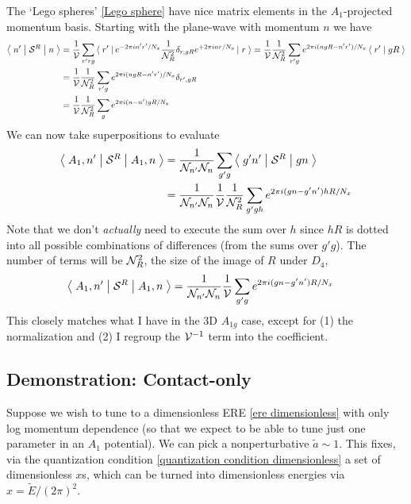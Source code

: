 The `Lego spheres' \eqref{Lego sphere} have nice matrix elements in the $A_1$-projected momentum basis.
Starting with the plane-wave with momentum $n$ we have
\begin{align}
    \left\langle\;n'\;\middle|\;\mathcal{S}^{R}\;\middle|\;n\;\right\rangle
    &=
    \frac{1}{\mathcal{V}} \sum_{r'rg} \left\langle\;r'\;\right| e^{-2\pi i n'r' / N_x} \frac{1}{\mathcal{N}_{R}^2} \delta_{r,gR} e^{+2\pi i nr / N_x} \left|\;r\;\right\rangle
    =
    \frac{1}{\mathcal{V}} \frac{1}{\mathcal{N}_{R}^2} \sum_{r'g} e^{2\pi i (n gR - n'r') / N_x} \left\langle\;r'\;\middle|\;gR\;\right\rangle
    \\
    &=
    \frac{1}{\mathcal{V}} \frac{1}{\mathcal{N}_{R}^2} \sum_{r'g} e^{2\pi i (n gR - n'r') / N_x} \delta_{r',gR}
    \\
    &=
    \frac{1}{\mathcal{V}} \frac{1}{\mathcal{N}_{R}^2} \sum_{g} e^{2\pi i (n-n') gR / N_x}
\end{align}
We can now take superpositions to evaluate
\begin{align}
    \left\langle\;A_1, n'\;\middle|\;\mathcal{S}^{R}\;\middle|\;A_1, n\;\right\rangle
    &=
    \frac{1}{\mathcal{N}_{n'}\mathcal{N}_{n}} \sum_{g'g} \left\langle\;g'n'\;\middle|\;\mathcal{S}^{R}\;\middle|\;gn\;\right\rangle
    \\
    &=
    \frac{1}{\mathcal{N}_{n'}\mathcal{N}_{n}} \frac{1}{\mathcal{V}}\frac{1}{\mathcal{N}_{R}^2} \sum_{g'gh} e^{2\pi i (gn-g'n') hR / N_x}
\end{align}
Note that we don't \emph{actually} need to execute the sum over $h$ since $hR$ is dotted into all possible combinations of differences (from the sums over $g'g$).
The number of terms will be $\mathcal{N}_{R}^2$, the size of the image of $R$ under $D_4$, 
\begin{align}
    \left\langle\;A_1, n'\;\middle|\;\mathcal{S}^{R}\;\middle|\;A_1, n\;\right\rangle
    &=
    \frac{1}{\mathcal{N}_{n'}\mathcal{N}_{n}} \frac{1}{\mathcal{V}} \sum_{g'g} e^{2\pi i (gn-g'n') R / N_x}
\end{align}
This closely matches what I have in the 3D $A_{1g}$ case, except for (1) the normalization and (2) I regroup the $\mathcal{V}^{-1}$ term into the coefficient.

\subsection{Demonstration: Contact-only}

Suppose we wish to tune to a dimensionless ERE \eqref{ere dimensionless} with only log momentum dependence (so that we expect to be able to tune just one parameter in an $A_1$ potential).
We can pick a nonperturbative $\tilde{a} \sim 1$.
This fixes, via the quantization condition \eqref{quantization condition dimensionless} a set of dimensionless $x$s, which can be turned into dimensionless energies via $x=\tilde{E}/(2\pi)^2$.


